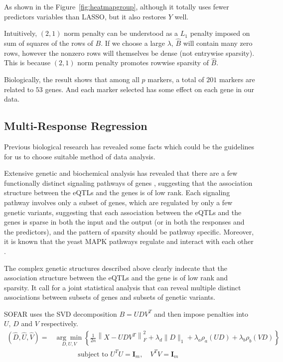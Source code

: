 As shown in the Figure~\ref{fig:heatmapgroup}, although it totally uses fewer predictors variables than LASSO, but it also restores $Y$ well. 

Intuitively, $(2,1)$ norm penalty can be understood as a $L_1$ penalty imposed on sum of squares of the rows of $B$. 
If we choose a large $\lambda$, $\widehat{B}$ will contain many zero rows, however the nonzero rows will themselves be dense (not entrywise sparsity). 
This is because $(2,1)$ norm penalty promotes rowwise sparsity of $\widehat{B}$. 

Biologically, the result shows that among all $p$ markers, a total of $201$ markers are related to $53$ genes. 
And each marker selected has some effect on each gene in our data.



\subsection{Multi-Response Regression}

Previous biological research has revealed some facts which could be the guidelines for us to choose suitable method of data analysis.

Extensive genetic and biochemical analysis has revealed that there are a few functionally distinct signaling pathways of genes \citep{gustin1998map, brem2005landscape}, suggesting that the association structure between the eQTLs and the genes is of low rank. 
Each signaling pathway involves only a subset of genes, which are regulated by only a few genetic variants, suggesting that each association between the eQTLs and the genes is sparse in both the input and the output (or in both the responses and the predictors), and the pattern of sparsity should be pathway specific. 
Moreover, it is known that the yeast MAPK pathways regulate and interact with each other \citep{gustin1998map}. 

The complex genetic structures described above clearly indecate that the association structure between the eQTLs and the gene is of low rank and sparsity. It call for a joint statistical analysis that can reveal multiple distinct associations between subsets of genes and subsets of genetic variants. 

SOFAR \citep{uematsu2019sofar} uses the SVD decomposition $B= UDV^T$ and then impose penalties into $U$, $D$ and $V$ respectively. 
\begin{equation} %
    \begin{split}
        \left( \widehat{D}, \widehat{U}, \widehat{V} \right) 
        = & \underset{D, U, V}{\arg \min }\left\{\frac{1}{2n} \left\|X- UDV^{T}\right\|_{F}^{2} + \lambda_{d}\|D\|_{1}+\lambda_{a} \rho_{a}(U D)+\lambda_{b} \rho_{b}(VD)\right\} \\ 
        & \quad\quad\quad \text { subject to } U^{T} U=\mathbf{I}_{m}, \quad V^{T} V=\mathbf{I}_{m} 
    \end{split}
\end{equation}

